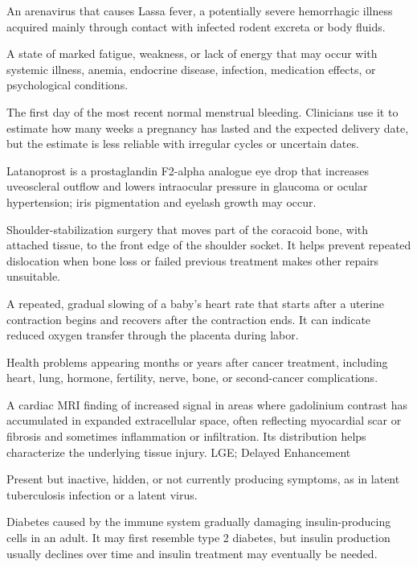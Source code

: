  An arenavirus that causes Lassa fever, a potentially severe hemorrhagic illness acquired mainly through contact with infected rodent excreta or body fluids.

 A state of marked fatigue, weakness, or lack of energy that may occur with systemic illness, anemia, endocrine disease, infection, medication effects, or psychological conditions.

 The first day of the most recent normal menstrual bleeding. Clinicians use it to estimate how many weeks a pregnancy has lasted and the expected delivery date, but the estimate is less reliable with irregular cycles or uncertain dates.

 Latanoprost is a prostaglandin F2-alpha analogue eye drop that increases uveoscleral outflow and lowers intraocular pressure in glaucoma or ocular hypertension; iris pigmentation and eyelash growth may occur.

 Shoulder-stabilization surgery that moves part of the coracoid bone, with attached tissue, to the front edge of the shoulder socket. It helps prevent repeated dislocation when bone loss or failed previous treatment makes other repairs unsuitable.

 A repeated, gradual slowing of a baby’s heart rate that starts after a uterine contraction begins and recovers after the contraction ends. It can indicate reduced oxygen transfer through the placenta during labor.

 Health problems appearing months or years after cancer treatment, including heart, lung, hormone, fertility, nerve, bone, or second-cancer complications.

 A cardiac MRI finding of increased signal in areas where gadolinium contrast has accumulated in expanded extracellular space, often reflecting myocardial scar or fibrosis and sometimes inflammation or infiltration. Its distribution helps characterize the underlying tissue injury.
\synonyms
LGE; Delayed Enhancement

 Present but inactive, hidden, or not currently producing symptoms, as in latent tuberculosis infection or a latent virus.

 Diabetes caused by the immune system gradually damaging insulin-producing cells in an adult. It may first resemble type 2 diabetes, but insulin production usually declines over time and insulin treatment may eventually be needed.


